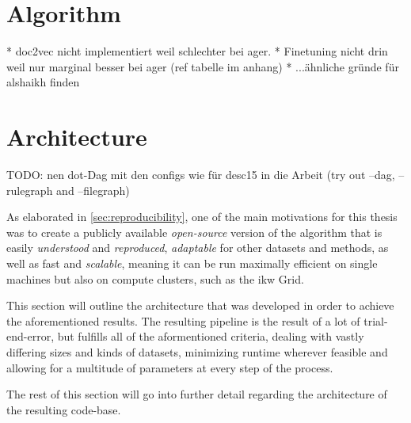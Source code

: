 \section{Algorithm}



* doc2vec nicht implementiert weil schlechter bei ager.
* Finetuning nicht drin weil nur marginal besser bei ager (ref tabelle im anhang)
* ...ähnliche gründe für alshaikh finden

\section{Architecture}
\label{sec:architecture}

TODO: nen dot-Dag mit den configs wie für desc15 in die Arbeit 
(try out --dag, --rulegraph and --filegraph)

As elaborated in \autoref{sec:reproducibility}, one of the main motivations for this thesis was to create a publicly available \textit{open-source} version of the algorithm that is easily \textit{understood} and \textit{reproduced}, \textit{adaptable} for other datasets and methods, as well as fast and \textit{scalable}, meaning it can be run maximally efficient on single machines but also on compute clusters, such as the \acrshort{ikw} Grid.


This section will outline the architecture that was developed in order to achieve the aforementioned results. The resulting pipeline is the result of a lot of trial-end-error, but fulfills all of the aformentioned criteria, dealing with vastly differing sizes and kinds of datasets, minimizing runtime wherever feasible and allowing for a multitude of parameters at every step of the process. %

The rest of this section will go into further detail regarding the architecture of the resulting code-base. 

